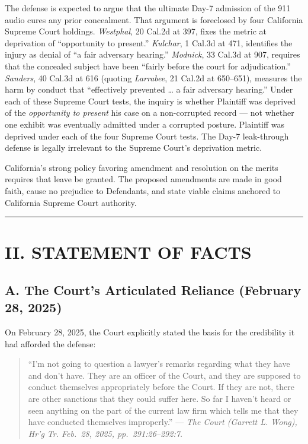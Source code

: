 The defense is expected to argue that the ultimate Day-7 admission of the 911 audio cures any prior concealment. That argument is foreclosed by four California Supreme Court holdings. \emph{Westphal}, 20 Cal.2d at 397, fixes the metric at deprivation of ``opportunity to present.'' \emph{Kulchar}, 1 Cal.3d at 471, identifies the injury as denial of ``a fair adversary hearing.'' \emph{Modnick}, 33 Cal.3d at 907, requires that the concealed subject have been ``fairly before the court for adjudication.'' \emph{Sanders}, 40 Cal.3d at 616 (quoting \emph{Larrabee}, 21 Cal.2d at 650--651), measures the harm by conduct that ``effectively prevented \ldots{} a fair adversary hearing.'' Under each of these Supreme Court tests, the inquiry is whether Plaintiff was deprived of the \emph{opportunity to present} his case on a non-corrupted record --- not whether one exhibit was eventually admitted under a corrupted posture. Plaintiff was deprived under each of the four Supreme Court tests. The Day-7 leak-through defense is legally irrelevant to the Supreme Court's deprivation metric.

California's strong policy favoring amendment and resolution on the merits requires that leave be granted. The proposed amendments are made in good faith, cause no prejudice to Defendants, and state viable claims anchored to California Supreme Court authority.

\begin{center}\rule{0.5\linewidth}{0.5pt}\end{center}

\label{toc:ii-statement-of-facts}
\section{II. STATEMENT OF FACTS}\label{ii.-statement-of-facts}

\subsection{A. The Court's Articulated Reliance (February 28, 2025)}\label{a.-the-courts-articulated-reliance-february-28-2025}

On February 28, 2025, the Court explicitly stated the basis for the credibility it had afforded the defense:

\begin{quote}
``I'm not going to question a lawyer's remarks regarding what they have and don't have. They are an officer of the Court, and they are supposed to conduct themselves appropriately before the Court. If they are not, there are other sanctions that they could suffer here. So far I haven't heard or seen anything on the part of the current law firm which tells me that they have conducted themselves improperly.'' --- \emph{The Court (Garrett L. Wong), Hr'g Tr. Feb.~28, 2025, pp.~291:26--292:7.}
\end{quote}


